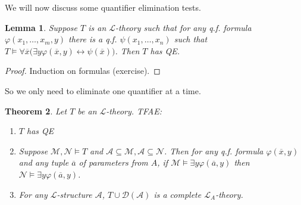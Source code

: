 \documentclass[]{article}
\theoremstyle{custhm}
\newtheorem{theorem}{Theorem}[section]
\theoremstyle{cusdef}
\theoremstyle{custhm}
\newtheorem{lemma}[theorem]{Lemma}
\theoremstyle{custhm}
\theoremstyle{custhm}
\theoremstyle{ex}
\theoremstyle{custhm}
\theoremstyle{cusdef}
\theoremstyle{remark}
\theoremstyle{remark}
\renewcommand{\L}{\mathcal{L}}
\newcommand{\M}{\mathcal{M}}
\renewcommand{\phi}{\varphi}
\renewcommand{\bar}{\overline}
\newcommand{\N}{\mathcal{N}}
\newcommand{\A}{\mathcal{A}}
\renewcommand{\subset}{\subseteq}
\begin{document}
We will now discuss some quantifier elimination tests.

\begin{lemma}
Suppose $T$ is an $\L$-theory such that for any q.f. formula $\phi(x_1,\dots,x_m,y)$ there is a q.f. $\psi(x_1,\dots,x_n)$ such that $T\models \forall \bar{x}\big(\exists y \phi(\bar{x},y)\leftrightarrow \psi(\bar{x})\big)$. Then $T$ has QE.
\end{lemma}
\begin{proof}
Induction on formulas (exercise).
\end{proof}

So we only need to eliminate one quantifier at a time.

\begin{theorem}
Let $T$ be an $\L$-theory. TFAE:
\begin{enumerate}[label=\roman*)]
	\item $T$ has QE
	\item Suppose $\M,\N\models T$ and $\A\subset\M,\A\subset\N$. Then for any q.f. formula $\phi(\bar{x},y)$ and any tuple $\bar{a}$ of parameters from $A$, if $\M\models \exists y\phi(\bar{a},y)$ then $\N\models \exists y \phi(\bar{a},y)$.
	\item For any $\L$-structure $\A$, $T\cup \mathcal{D}(\A)$ is a complete $\L_A$-theory.
\end{enumerate}
\end{theorem}
\end{document}

